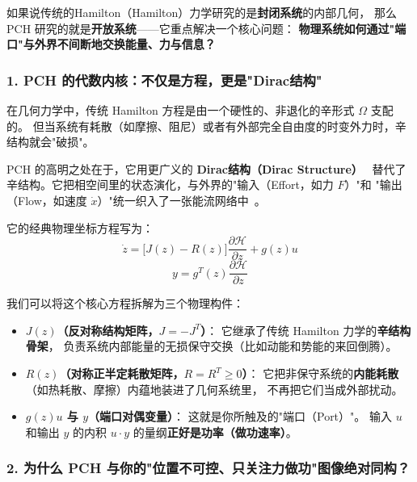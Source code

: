 ﻿\documentclass[10pt,a4paper]{article}
\numberwithin{equation}{section}
\begin{document}
\begin{framed}



如果说传统的Hamilton（Hamilton）力学研究的是\textbf{封闭系统}的内部几何，
那么 PCH 研究的就是\textbf{开放系统}——它重点解决一个核心问题：
\textbf{物理系统如何通过"端口"与外界不间断地交换能量、力与信息？}

\subsubsection*{1. PCH 的代数内核：不仅是方程，更是"Dirac结构"}

在几何力学中，传统 Hamilton 方程是由一个硬性的、非退化的辛形式 $\Omega$ 支配的。
但当系统有耗散（如摩擦、阻尼）或者有外部完全自由度的时变外力时，辛结构就会"破损"。

PCH 的高明之处在于，它用更广义的 \textbf{Dirac结构（Dirac Structure）}~\cite{Courant1990}
替代了辛结构。它把相空间里的状态演化，与外界的"输入（Effort，如力 $F$）"和
"输出（Flow，如速度 $\dot{x}$）"统一织入了一张能流网络中~\cite{VanDerSchaftMaschke2002,VanDerSchaftJeltsema2014}。

它的经典物理坐标方程写为：
\begin{equation}
  \dot{z} = \bigl[J(z) - R(z)\bigr] \frac{\partial \mathcal{H}}{\partial z} + g(z)u
\end{equation}
\begin{equation}
  y = g^T(z) \frac{\partial \mathcal{H}}{\partial z}
\end{equation}

我们可以将这个核心方程拆解为三个物理构件：
\begin{itemize}
  \item \textbf{$J(z)$（反对称结构矩阵，$J = -J^T$）}：
  它继承了传统 Hamilton 力学的\textbf{辛结构骨架}，
  负责系统内部能量的无损保守交换（比如动能和势能的来回倒腾）。
  \item \textbf{$R(z)$（对称正半定耗散矩阵，$R = R^T \ge 0$）}：
  它把非保守系统的\textbf{内能耗散}（如热耗散、摩擦）内蕴地装进了几何系统里，
  不再把它们当成外部扰动。
  \item \textbf{$g(z)u$ 与 $y$（端口对偶变量）}：
  这就是你所触及的"端口（Port）"。
  输入 $u$ 和输出 $y$ 的内积 $u \cdot y$ 的量纲\textbf{正好是功率（做功速率）}。
\end{itemize}

\subsubsection*{2. 为什么 PCH 与你的"位置不可控、只关注力做功"图像绝对同构？}


\end{framed}
\end{document}
